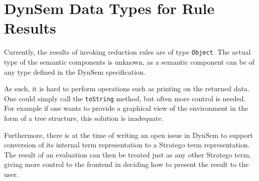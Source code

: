 \section{DynSem Data Types for Rule Results}
\label{sec:dynsem-data-repr}

Currently, the results of invoking reduction rules are of type \texttt{Object}.
The actual type of the semantic components is unknown, as a semantic component
can be of any type defined in the DynSem specification.

As such, it is hard to perform operations such as printing on the returned
data. One could simply call the \texttt{toString} method, but often more
control is needed. For example if one wants to provide a graphical view of the
environment in the form of a tree structure, this solution is inadequate.

Furthermore, there is at the time of writing an open issue in DynSem to support
conversion of its internal term representation to a Stratego term
representation. The result of an evaluation can then be treated just as any
other Stratego term, giving more control to the frontend in deciding how to
present the result to the user.


